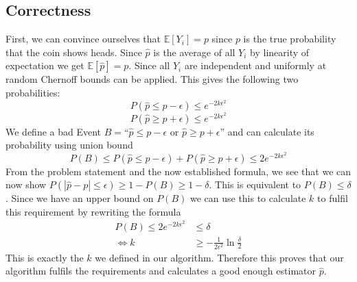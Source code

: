 \documentclass{article}
\begin{document}
\subsection{Correctness}
First, we can convince ourselves that $\mathbb{E}[Y_i]=p$ since $p$ is the true probability that the coin shows heads. 
Since $\hat{p}$ is the average of all $Y_i$ by linearity of expectation we get $\mathbb{E}[\hat{p}]=p$. Since all $Y_i$ are independent and uniformly at random Chernoff bounds can be applied.
This gives the following two probabilities:
$$P(\hat{p} \leq p-\epsilon) \leq e^{-2k\epsilon^2}$$
$$P(\hat{p}\geq p+\epsilon) \leq e^{-2k\epsilon^2}$$
We define a bad Event $B=$``$\hat{p} \leq p-\epsilon$ or $\hat{p}\geq p+\epsilon$'' and can calculate its probability using union bound
$$P(B) \leq P(\hat{p} \leq p-\epsilon) + P(\hat{p}\geq p+\epsilon) \leq 2e^{-2k\epsilon^2}$$
From the problem statement and the now established formula, we see that we can now show $P(|\hat{p}-p|\leq \epsilon) \geq 1 - P(B)\geq 1-\delta$. This is equivalent to $P(B) \leq \delta$. Since we have an upper bound on $P(B)$ we can use this to calculate $k$ to fulfil this requirement by rewriting the formula
\begin{equation*}
    \begin{split}
        P(B)\leq 2e^{-2k\epsilon^2}&\leq \delta\\
       \Leftrightarrow k&\geq -\frac{1}{2\epsilon^2}\ln{\frac{\delta}{2}}
    \end{split}
\end{equation*}
This is exactly the $k$ we defined in our algorithm. Therefore this proves that our algorithm fulfils the requirements and calculates a good enough estimator $\hat{p}$.

% 
% 
\end{document}

